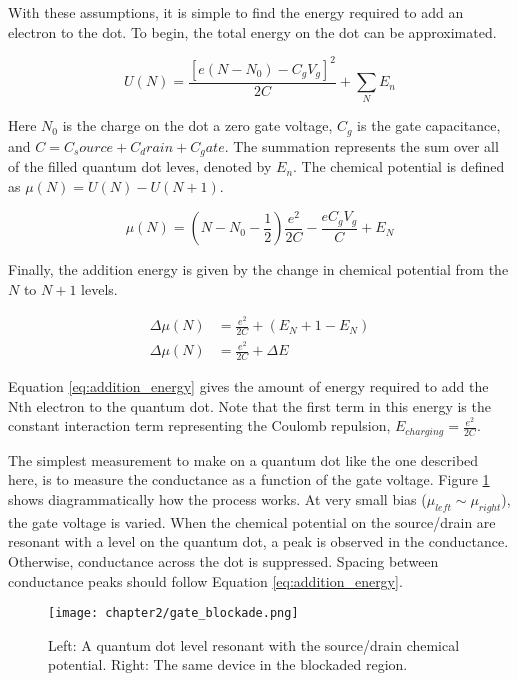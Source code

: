 With these assumptions, it is simple to find the energy required to add an electron to the dot. To begin, the total energy on the dot can be approximated.

\begin{equation}
    U(N) = \frac{[e(N-N_0) - C_gV_g]^2}{2C} + \sum_{N}^{} E_n
\end{equation}

Here $N_0$ is the charge on the dot a zero gate voltage, $C_g$ is the gate capacitance, and $C = C_source + C_drain + C_gate$. The summation represents the sum over all of the filled quantum dot leves, denoted by $E_n$. The chemical potential is defined as $\mu(N) = U(N) - U(N+1)$. 

\begin{equation}
    \mu(N) = (N - N_0 - \frac{1}{2})\frac{e^2}{2C} - \frac{eC_gV_g}{C} + E_N
\end{equation}

Finally, the addition energy is given by the change in chemical potential from the $N$ to $N+1$ levels.

\begin{align}
    \Delta \mu(N) &= \frac{e^2}{2C} + (E_N+1 - E_N) \nonumber \\
    \Delta \mu(N) &= \frac{e^2}{2C} + \Delta E  \label{eq:addition_energy}
\end{align}

Equation \ref{eq:addition_energy} gives the amount of energy required to add the Nth electron to the quantum dot. Note that the first term in this energy is the constant interaction term representing the Coulomb repulsion, $E_{charging} = \frac{e^2}{2C}$. 

The simplest measurement to make on a quantum dot like the one described here, is to measure the conductance as a function of the gate voltage. Figure \ref{fig:gate_blockade} shows diagrammatically how the process works. At very small bias ($\mu_{left} \sim \mu_{right}$), the gate voltage is varied. When the chemical potential on the source/drain are resonant with a level on the quantum dot, a peak is observed in the conductance. Otherwise, conductance  across the dot is suppressed. Spacing between conductance peaks should follow Equation \ref{eq:addition_energy}.

\begin{figure}
    \centering
    \texttt{[image: chapter2/gate\_blockade.png]}
    \caption{Left: A quantum dot level resonant with the source/drain chemical potential. Right: The same device in the blockaded region.}
    \label{fig:gate_blockade}
\end{figure}

